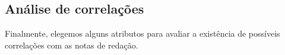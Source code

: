 \documentclass[12pt]{article}
\newcommand{\reffig}[1]{Fig.~\ref{fig:#1}}
\begin{document}

\subsection{Análise de correlações}
Finalmente, elegemos alguns atributos para avaliar a existência de possíveis correlações com as notas de redação.

\end{document}
